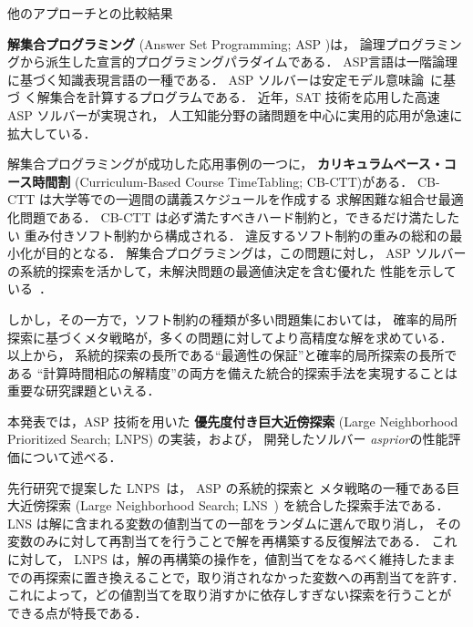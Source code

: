 
\begin{table*}[t]\centering
  \caption{他のアプローチとの比較結果}
  \label{table:bench:result2}
  \begin{tableB}
    
  \end{tableB}
\end{table*}


\textbf{解集合プログラミング}
(Answer Set Programming; ASP
\cite{DBLP:conf/iclp/GelfondL88})は，
論理プログラミングから派生した宣言的プログラミングパラダイムである．
ASP言語は一階論理に基づく知識表現言語の一種である．
ASP ソルバーは安定モデル意味論~\cite{DBLP:conf/iclp/GelfondL88}に基づ
く解集合を計算するプログラムである．
近年，SAT 技術を応用した高速 ASP ソルバーが実現され，
人工知能分野の諸問題を中心に実用的応用が急速に拡大している．%

解集合プログラミングが成功した応用事例の一つに，
\textbf{カリキュラムベース・コース時間割}
(Curriculum-Based Course TimeTabling; CB-CTT)がある．
CB-CTT は大学等での一週間の講義スケジュールを作成する
求解困難な組合せ最適化問題である．
CB-CTT は必ず満たすべきハード制約と，できるだけ満たしたい
重み付きソフト制約から構成される．
違反するソフト制約の重みの総和の最小化が目的となる．
解集合プログラミングは，この問題に対し，
ASP ソルバーの系統的探索を活かして，未解決問題の最適値決定を含む優れた
性能を示している~\cite{anor/Banbara2019}．

しかし，その一方で，ソフト制約の種類が多い問題集においては，
確率的局所探索に基づくメタ戦略が，多くの問題に対してより高精度な解を求めている．
以上から，
系統的探索の長所である``最適性の保証''と確率的局所探索の長所である
``計算時間相応の解精度''の両方を備えた統合的探索手法を実現することは
重要な研究課題といえる．

本発表では，ASP 技術を用いた
\textbf{優先度付き巨大近傍探索}
(Large Neighborhood Prioritized Search; LNPS)
の実装，および，
開発したソルバー \textit{asprior}の性能評価について述べる．

先行研究で提案した LNPS~\cite{jsai2021:kutaba}は，
ASP の系統的探索と
メタ戦略の一種である巨大近傍探索
(Large Neighborhood Search; LNS~\cite{Pisinger10})
を統合した探索手法である．
%
LNS は解に含まれる変数の値割当ての一部をランダムに選んで取り消し，
その変数のみに対して再割当てを行うことで解を再構築する反復解法である．
これに対して，
LNPS は，解の再構築の操作を，値割当てをなるべく維持したまま
での再探索に置き換えることで，取り消されなかった変数への再割当てを許す．
これによって，どの値割当てを取り消すかに依存しすぎない探索を行うことが
できる点が特長である．

